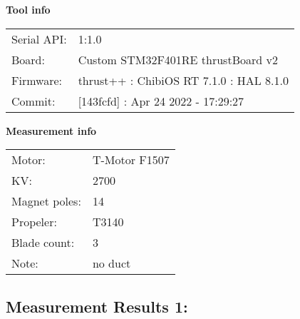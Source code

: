 \documentclass[10pt]{article}
\begin{document}
\noindent
{\large \bf Tool info}
\vspace{3mm}

\noindent
\begin{tabular}{ll}
Serial API:  & 1:1.0\\ 
Board:       & Custom STM32F401RE thrustBoard v2\\ 
Firmware:    & thrust++ : ChibiOS RT 7.1.0 : HAL 8.1.0\\ 
Commit:      & [143fcfd] : Apr 24 2022 - 17:29:27
\end{tabular}
\vspace{3mm}

\noindent
{\large \bf Measurement info}
\vspace{3mm}

\noindent
\begin{tabular}{ll}
Motor:        & T-Motor F1507\\ 
KV:           & 2700\\ 
Magnet poles: & 14\\ 
Propeler:     & T3140\\ 
Blade count:  & 3\\ 
Note:         & no duct
\end{tabular}

\vspace{3mm}


\subsection*{\large \bf Measurement Results 1:}
\end{document}
